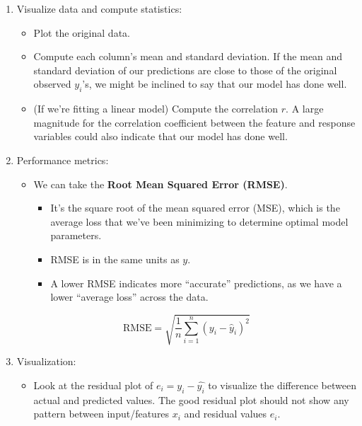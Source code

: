 \documentclass[
  letterpaper,
  DIV=11,
  numbers=noendperiod]{scrreprt}
\providecommand{\tightlist}{%
  \setlength{\itemsep}{0pt}\setlength{\parskip}{0pt}}\usepackage{longtable,booktabs,array}
\begin{document}
\begin{enumerate}
\def\labelenumi{\arabic{enumi}.}
\item
  Visualize data and compute statistics:

  \begin{itemize}
  \tightlist
  \item
    Plot the original data.
  \item
    Compute each column's mean and standard deviation. If the mean and
    standard deviation of our predictions are close to those of the
    original observed \(y_i\)'s, we might be inclined to say that our
    model has done well.
  \item
    (If we're fitting a linear model) Compute the correlation \(r\). A
    large magnitude for the correlation coefficient between the feature
    and response variables could also indicate that our model has done
    well.
  \end{itemize}
\item
  Performance metrics:

  \begin{itemize}
  \tightlist
  \item
    We can take the \textbf{Root Mean Squared Error (RMSE)}.

    \begin{itemize}
    \tightlist
    \item
      It's the square root of the mean squared error (MSE), which is the
      average loss that we've been minimizing to determine optimal model
      parameters.
    \item
      RMSE is in the same units as \(y\).
    \item
      A lower RMSE indicates more ``accurate'' predictions, as we have a
      lower ``average loss'' across the data.
    \end{itemize}
  \end{itemize}

  \[\text{RMSE} = \sqrt{\frac{1}{n} \sum_{i=1}^n (y_i - \hat{y}_i)^2}\]
\item
  Visualization:

  \begin{itemize}
  \tightlist
  \item
    Look at the residual plot of \(e_i = y_i - \hat{y_i}\) to visualize
    the difference between actual and predicted values. The good
    residual plot should not show any pattern between input/features
    \(x_i\) and residual values \(e_i\).
  \end{itemize}
\end{enumerate}
\end{document}
